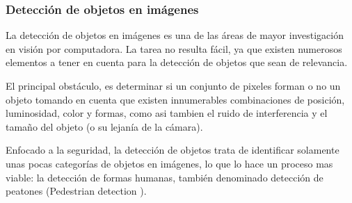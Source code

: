\documentclass[a4paper,12pt,twoside]{article}
\begin{document}
\subsubsection{Detección de objetos en imágenes}
La detección de objetos en imágenes es una de las áreas de mayor investigación en visión por computadora. La tarea no resulta fácil, ya que existen numerosos elementos a tener en cuenta para la detección de objetos que sean de relevancia. \par
El principal obstáculo, es determinar si un conjunto de pixeles forman o no un objeto tomando en cuenta que existen innumerables combinaciones de posición, luminosidad, color y formas, como asi tambien el ruido de interferencia y el tamaño del objeto (o su lejanía de la cámara).\par
Enfocado a la seguridad, la detección de objetos trata de identificar solamente unas pocas categorías de objetos en imágenes, lo que lo hace un proceso mas viable: la detección de formas humanas, también denominado detección de peatones (Pedestrian detection \cite{zhang1}).
	
\end{document}
